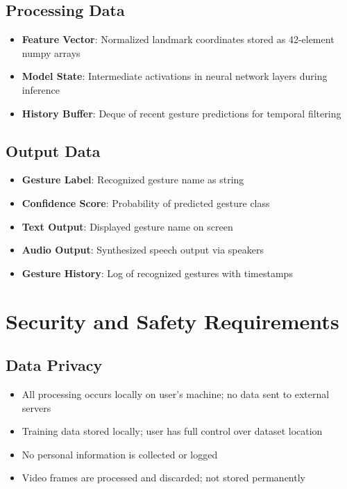 \subsection{Processing Data}

\begin{itemize}
    \item \textbf{Feature Vector}: Normalized landmark coordinates stored as 42-element numpy arrays
    \item \textbf{Model State}: Intermediate activations in neural network layers during inference
    \item \textbf{History Buffer}: Deque of recent gesture predictions for temporal filtering
\end{itemize}

\subsection{Output Data}

\begin{itemize}
    \item \textbf{Gesture Label}: Recognized gesture name as string
    \item \textbf{Confidence Score}: Probability of predicted gesture class
    \item \textbf{Text Output}: Displayed gesture name on screen
    \item \textbf{Audio Output}: Synthesized speech output via speakers
    \item \textbf{Gesture History}: Log of recognized gestures with timestamps
\end{itemize}

\section{Security and Safety Requirements}

\subsection{Data Privacy}

\begin{itemize}
    \item All processing occurs locally on user's machine; no data sent to external servers
    \item Training data stored locally; user has full control over dataset location
    \item No personal information is collected or logged
    \item Video frames are processed and discarded; not stored permanently
\end{itemize}

